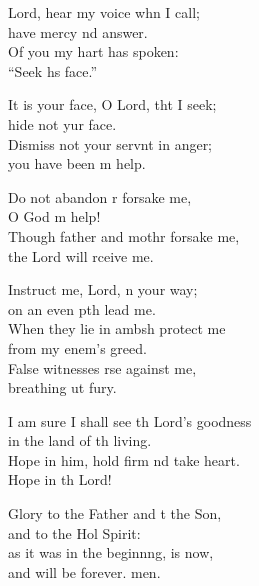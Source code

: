 \settowidth{\versewidth}{I am sure I shall see the Lord’s goodness *}
\begin{psalmverse}%
  \begin{patverse}
 Lord, hear my voice whn I call;\Med\\
have mercy nd answer.\\
Of you my hart has spoken:\Med\\
“Seek h\pointup{\i}s face.”

It is your face, O Lord, tht I seek;\Med\\
hide not yur face.\\
Dismiss not your servnt in anger;\Med\\
you have been m help.

Do not abandon r forsake me,\Med\\
O God m help!\\
Though father and mothr forsake me,\Med\\
the Lord will rceive me.

Instruct me, Lord, \pointup{\i}n your way;\Med\\
on an even pth lead me.\\
When they lie in ambsh protect me\Med\\
from my enem’s greed.\\
False witnesses r\pointup{\i}se against me,\Med\\
breathing ut fury.

I am sure I shall see th Lord’s goodness\Med\\
in the land of th living.\\
Hope in him, hold firm nd take heart.\Med\\
Hope in th Lord!

Glory to the Father and t the Son,\Med\\
and to the Hol Spirit:\\
as it was in the beginn\pointup{\i}ng, is now,\Med\\
and will be forever. men.
  \end{patverse}
\end{psalmverse}
